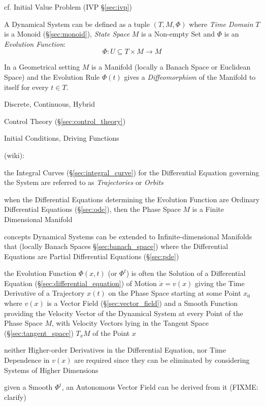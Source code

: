 \fist cf. Initial Value Problem (IVP \S\ref{sec:ivp})

A Dynamical System can be defined as a tuple $(T,M,\Phi)$ where \emph{Time
  Domain} $T$ is a Monoid (\S\ref{sec:monoid}), \emph{State Space} $M$ is a
Non-empty Set and $\Phi$ is an \emph{Evolution Function}:
\[
  \Phi : U \subseteq T \times M \rightarrow M
\]

In a Geometrical setting $M$ is a Manifold (locally a Banach Space or Euclidean
Space) and the Evolution Rule $\Phi(t)$ gives a \emph{Diffeomorphism} of the
Manifold to itself for every $t \in T$. %

Discrete, Continuous, Hybrid

Control Theory (\S\ref{sec:control_theory})

Initial Conditions, Driving Functions


(wiki):

the Integral Curves (\S\ref{sec:integral_curve}) for the Differential Equation
governing the System are referred to as \emph{Trajectories} or \emph{Orbits}

when the Differential Equations determining the Evolution Function are Ordinary
Differential Equations (\S\ref{sec:ode}), then the Phase Space $M$ is a Finite
Dimensional Manifold

concepts Dynamical Systems can be extended to Infinite-dimensional Manifolds
that (locally Banach Spaces \S\ref{sec:banach_space}) where the Differential
Equations are Partial Differential Equations (\S\ref{sec:pde})

the Evolution Function $\Phi(x,t)$ (or $\Phi^t$) is often the Solution of a
Differential Equation (\S\ref{sec:differential_equation}) of Motion $\dot{x} =
v(x)$ giving the Time Derivative of a Trajectory $x(t)$ on the Phase Space
starting at some Point $x_0$ where $v(x)$ is a Vector Field
(\S\ref{sec:vector_field}) and a Smooth Function providing the Velocity Vector
of the Dynamical System at every Point of the Phase Space $M$, with Velocity
Vectors lying in the Tangent Space (\S\ref{sec:tangent_space}) $T_xM$ of the
Point $x$

neither Higher-order Derivatives in the Differential Equation, nor Time
Dependence in $v(x)$ are required since they can be eliminated by considering
Systems of Higher Dimensions

given a Smooth $\Phi^t$, an Autonomous Vector Field can be derived from it
(FIXME: clarify)

